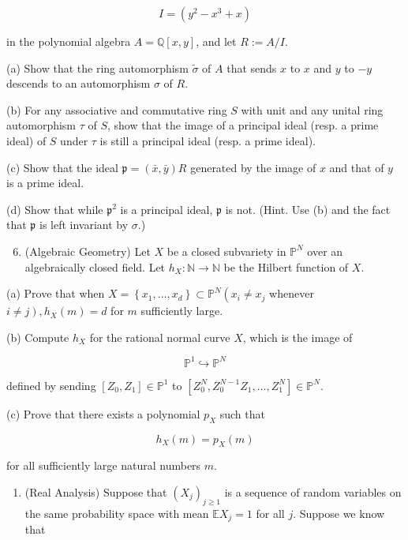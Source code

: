 \documentclass[10pt]{article}
\begin{document}
$$
I=\left(y^{2}-x^{3}+x\right)
$$

in the polynomial algebra $A=\mathbb{Q}[x, y]$, and let $R:=A / I$.

(a) Show that the ring automorphism $\widetilde{\sigma}$ of $A$ that sends $x$ to $x$ and $y$ to $-y$ descends to an automorphism $\sigma$ of $R$.

(b) For any associative and commutative ring $S$ with unit and any unital ring automorphism $\tau$ of $S$, show that the image of a principal ideal (resp. a prime ideal) of $S$ under $\tau$ is still a principal ideal (resp. a prime ideal).

(c) Show that the ideal $\mathfrak{p}=(\bar{x}, \bar{y}) R$ generated by the image of $x$ and that of $y$ is a prime ideal.

(d) Show that while $\mathfrak{p}^{2}$ is a principal ideal, $\mathfrak{p}$ is not. (Hint. Use (b) and the fact that $\mathfrak{p}$ is left invariant by $\sigma$.)

\begin{enumerate}
  \setcounter{enumi}{5}
  \item (Algebraic Geometry) Let $X$ be a closed subvariety in $\mathbb{P}^{N}$ over an algebraically closed field. Let $h_{X}: \mathbb{N} \rightarrow \mathbb{N}$ be the Hilbert function of $X$.
\end{enumerate}

(a) Prove that when $X=\left\{x_{1}, \ldots, x_{d}\right\} \subset \mathbb{P}^{N}\left(x_{i} \neq x_{j}\right.$ whenever $\left.i \neq j\right), h_{X}(m)=d$ for $m$ sufficiently large.

(b) Compute $h_{X}$ for the rational normal curve $X$, which is the image of

$$
\mathbb{P}^{1} \hookrightarrow \mathbb{P}^{N}
$$

defined by sending $\left[Z_{0}, Z_{1}\right] \in \mathbb{P}^{1}$ to $\left[Z_{0}^{N}, Z_{0}^{N-1} Z_{1}, \ldots, Z_{1}^{N}\right] \in \mathbb{P}^{N}$.

(c) Prove that there exists a polynomial $p_{X}$ such that

$$
h_{X}(m)=p_{X}(m)
$$

for all sufficiently large natural numbers $m$.

\begin{enumerate}
  \item (Real Analysis) Suppose that $\left(X_{j}\right)_{j \geq 1}$ is a sequence of random variables on the same probability space with mean $\mathbb{E} X_{j}=1$ for all $j$. Suppose we know that
\end{enumerate}
\end{document}
